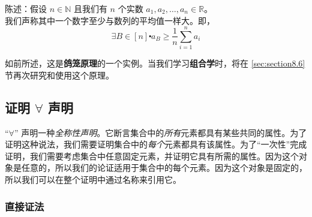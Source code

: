 \begin{example}[鸽笼原理的一个实例]

    \begin{center}
        陈述：假设 $n \in \mathbb{N}$ 且我们有 $n$ 个实数 $a_1, a_2, \dots, a_n \in \mathbb{R}$。\\
        我们声称其中一个数字至少与数列的平均值一样大。即，
        \[\exists B \in [n] \centerdot a_B \ge \frac{1}{n}\sum_{i=1}^{n}a_i\]
    \end{center}

    \begin{center}
        \noindent {}
    \end{center}

    如前所述，这是\textbf{鸽笼原理}的一个实例。当我们学习\textbf{组合学}时，将在 \ref{sec:section8.6} 节再次研究和使用这个原理。
\end{example}

\subsection{证明 $\forall$ 声明}\label{sec:section4.9.2}

``$\forall$'' 声明一种\emph{全称性声明}。它断言集合中的\emph{所有}元素都具有某些共同的属性。为了证明这种说法，我们需要证明集合中的\emph{每个}元素都具有该属性。为了``一次性''完成证明，我们需要考虑集合中任意固定元素，并证明它具有所需的属性。因为这个对象是任意的，所以我们的论证适用于集合中的每个元素。因为这个对象是固定的，所以我们可以在整个证明中通过名称来引用它。

\subsubsection*{直接证法}

